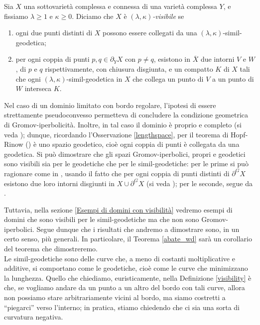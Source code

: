 \begin{defn} \label{visibility}
    Sia $X$ una sottovarietà complessa e connessa di una varietà complessa $Y$, e fissiamo $\lambda \ge 1$ e $\kappa \ge 0$. Diciamo che $X$ è \textit{$(\lambda,\kappa)$-visibile} se
    \begin{enumerate}
        \item ogni due punti distinti di $X$ possono essere collegati da una $(\lambda,\kappa)$-simil-geodetica;
        \item per ogni coppia di punti $p,q\in\partial_YX$ con $p\not=q$, esistono in $\overline{X}$ due intorni $V$ e $W$, di $p$ e $q$ rispettivamente, con chiusura disgiunta, e un compatto $K$ di $X$ tali che  ogni $(\lambda,\kappa)$-simil-geodetica in $X$ che collega un punto di $V$ a un punto di $W$ interseca $K$.
    \end{enumerate}
\end{defn}

\begin{oss} \label{spscvxisvis}
    Nel caso di un dominio limitato con bordo regolare, l'ipotesi di essere strettamente pseudoconvesso permetteva di concludere la condizione geometrica di Gromov-iperbolicità. Inoltre, in tal caso il dominio è proprio e completo (si veda \cite[Paragraph 3.3]{G}); dunque, ricordando l'Osservazione \ref{lengthspace}, per il teorema di Hopf-Rinow (\cite[Part I, Proposition 3.7]{BH}) è uno spazio geodetico, cioè ogni coppia di punti è collegata da una geodetica. Si può dimostrare che gli spazi Gromov-iperbolici, propri e geodetici sono visibili sia per le geodetiche che per le simil-geodetiche: per le prime si può ragionare come in \cite[Proposition 2.5]{BNT}, usando il fatto che per ogni coppia di punti distinti di $\partial^G X$ esistono due loro intorni disgiunti in $X\cup\partial^GX$ (si veda \cite[Part III, Chapter H, Lemma 3.6]{BH}); per le seconde, segue da \cite[Part III, Chapter H, Theorem 1.7]{BH}.
\end{oss}

Tuttavia, nella sezione \ref{Esempi di domini con visibilità} vedremo esempi di domini che sono visibili per le simil-geodetiche ma che non sono Gromov-iperbolici. Segue dunque che i risultati che andremo a dimostrare sono, in un certo senso, più generali. In particolare, il Teorema \ref{abate_wd} sarà un corollario del teorema che dimostreremo. \\

Le simil-geodetiche sono delle curve che, a meno di costanti moltiplicative e additive, si comportano come le geodetiche, cioè come le curve che minimizzano la lunghezza.
Quello che chiediamo, euristicamente, nella Definizione \ref{visibility} è che, se vogliamo andare da un punto a un altro del bordo con tali curve, allora non possiamo stare arbitrariamente vicini al bordo, ma siamo costretti a ``piegarci'' verso l'interno; in pratica, stiamo chiedendo che ci sia una sorta di curvatura negativa.

